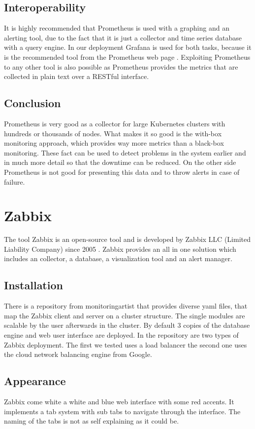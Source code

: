 \subsection{Interoperability}
It is highly recommended that Prometheus is used with a graphing and an alerting tool, due to the fact that it is just a collector and time series database with a query engine. In our deployment Grafana is used for both tasks, because it is the recommended tool from the Prometheus web page \cite{prometheus}. Exploiting Prometheus to any other tool is also possible as Prometheus provides the metrics that are collected in plain text over a RESTful interface.
\subsection{Conclusion}
Prometheus is very good as a collector for large Kubernetes clusters with hundreds or thousands of nodes. What makes it so good is the with-box monitoring approach, which provides way more metrics than a black-box monitoring. These fact can be used to detect problems in the system earlier and in much more detail so that the downtime can be reduced. On the other side Prometheus is not good for presenting this data and to throw alerts in case of failure.

\section{Zabbix}
\label{Zabbix} %
\cite{Hernantes2015}
The tool Zabbix is an open-source tool and is developed by Zabbix LLC (Limited Liability Company) since 2005 \cite{zabbix}. Zabbix provides an all in one solution which includes an collector, a database, a visualization tool and an alert manager.
\subsection{Installation}
There is a repository from monitoringartist \cite{zabbix_kube} that provides diverse yaml files, that map the Zabbix client and server on a cluster structure. The single modules are scalable by the user afterwards in the cluster. By default 3 copies of the database engine and web user interface are deployed. In the repository are two types of Zabbix deployment. The first we tested uses a load balancer the second one uses the cloud network balancing engine from Google.
\subsection{Appearance}%
Zabbix come white a white and blue web interface with some red accents. It implements a tab system with sub tabs to navigate through the interface. The naming of the tabs is not as self explaining as it could be.  
